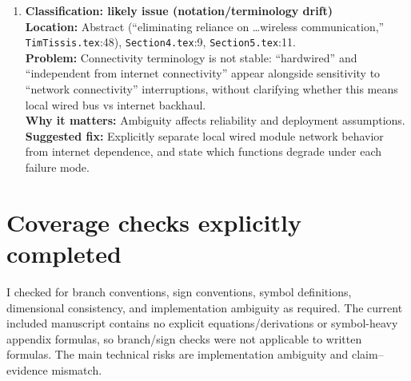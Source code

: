 \documentclass[11pt]{article}
\begin{document}
\begin{enumerate}[leftmargin=*,label=\textbf{T\arabic*.}]
  \item \textbf{Classification: likely issue (notation/terminology drift)}\\
  \textbf{Location:} Abstract (``eliminating reliance on \ldots wireless communication,'' \texttt{TimTissis.tex}:48), \texttt{Section4.tex}:9, \texttt{Section5.tex}:11.\\
  \textbf{Problem:} Connectivity terminology is not stable: ``hardwired'' and ``independent from internet connectivity'' appear alongside sensitivity to ``network connectivity'' interruptions, without clarifying whether this means local wired bus vs internet backhaul.\\
  \textbf{Why it matters:} Ambiguity affects reliability and deployment assumptions.\\
  \textbf{Suggested fix:} Explicitly separate local wired module network behavior from internet dependence, and state which functions degrade under each failure mode.
\end{enumerate}

\section*{Coverage checks explicitly completed}
I checked for branch conventions, sign conventions, symbol definitions, dimensional consistency, and implementation ambiguity as required. The current included manuscript contains no explicit equations/derivations or symbol-heavy appendix formulas, so branch/sign checks were not applicable to written formulas. The main technical risks are implementation ambiguity and claim--evidence mismatch.
\end{document}
